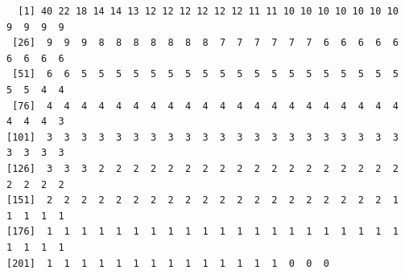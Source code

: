 \documentclass[
  letterpaper,
  DIV=11,
  numbers=noendperiod]{scrartcl}
\newenvironment{Shaded}{\begin{snugshade}}{\end{snugshade}}
\newcommand{\AttributeTok}[1]{\textcolor[rgb]{0.40,0.45,0.13}{#1}}
\newcommand{\CommentTok}[1]{\textcolor[rgb]{0.37,0.37,0.37}{#1}}
\newcommand{\ConstantTok}[1]{\textcolor[rgb]{0.56,0.35,0.01}{#1}}
\newcommand{\DecValTok}[1]{\textcolor[rgb]{0.68,0.00,0.00}{#1}}
\newcommand{\FloatTok}[1]{\textcolor[rgb]{0.68,0.00,0.00}{#1}}
\newcommand{\FunctionTok}[1]{\textcolor[rgb]{0.28,0.35,0.67}{#1}}
\newcommand{\NormalTok}[1]{\textcolor[rgb]{0.00,0.23,0.31}{#1}}
\newcommand{\OtherTok}[1]{\textcolor[rgb]{0.00,0.23,0.31}{#1}}
\newcommand{\SpecialCharTok}[1]{\textcolor[rgb]{0.37,0.37,0.37}{#1}}
\begin{document}
\begin{Shaded}
\end{Shaded}

\begin{verbatim}
  [1] 40 22 18 14 14 13 12 12 12 12 12 12 11 11 10 10 10 10 10 10 10  9  9  9  9
 [26]  9  9  9  8  8  8  8  8  8  8  7  7  7  7  7  7  6  6  6  6  6  6  6  6  6
 [51]  6  6  5  5  5  5  5  5  5  5  5  5  5  5  5  5  5  5  5  5  5  5  5  4  4
 [76]  4  4  4  4  4  4  4  4  4  4  4  4  4  4  4  4  4  4  4  4  4  4  4  4  3
[101]  3  3  3  3  3  3  3  3  3  3  3  3  3  3  3  3  3  3  3  3  3  3  3  3  3
[126]  3  3  3  2  2  2  2  2  2  2  2  2  2  2  2  2  2  2  2  2  2  2  2  2  2
[151]  2  2  2  2  2  2  2  2  2  2  2  2  2  2  2  2  2  2  2  2  1  1  1  1  1
[176]  1  1  1  1  1  1  1  1  1  1  1  1  1  1  1  1  1  1  1  1  1  1  1  1  1
[201]  1  1  1  1  1  1  1  1  1  1  1  1  1  1  0  0  0
\end{verbatim}

\begin{Shaded}
\end{Shaded}
\end{document}
